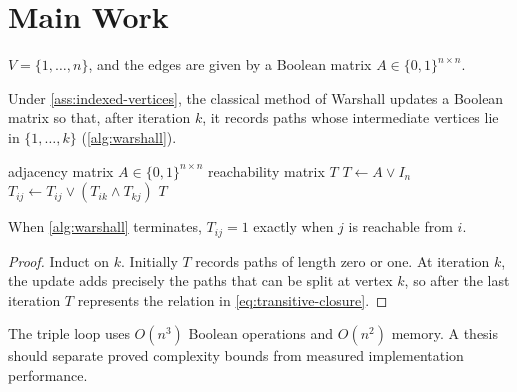 \chapter{Main Work}
\label{ch:main-work}


\begin{assumption}
\label{ass:indexed-vertices}
$V=\{1,\dots,n\}$, and the edges are given by a Boolean matrix
$A\in\{0,1\}^{n\times n}$.
\end{assumption}

Under \cref{ass:indexed-vertices}, the classical method of Warshall
\cite{warshall1962} updates a Boolean matrix so that, after iteration $k$, it
records paths whose intermediate vertices lie in $\{1,\dots,k\}$
(\cref{alg:warshall}).

\begin{algorithm}[htbp]
\caption{Reflexive transitive closure of an adjacency matrix}
\label{alg:warshall}
\begin{algorithmic}[1]
  \Require adjacency matrix $A\in\{0,1\}^{n\times n}$
  \Ensure reachability matrix $T$
  \State $T\gets A\lor I_n$
        \State $T_{ij}\gets T_{ij}\lor(T_{ik}\land T_{kj})$
      \EndFor
    \EndFor
  \EndFor
  \State \Return $T$
\end{algorithmic}
\end{algorithm}

\begin{proposition}
\label{prop:warshall-correct}
When \cref{alg:warshall} terminates, $T_{ij}=1$ exactly when $j$ is reachable
from $i$.
\end{proposition}

\begin{proof}
Induct on $k$. Initially $T$ records paths of length zero or one. At iteration
$k$, the update adds precisely the paths that can be split at vertex $k$, so
after the last iteration $T$ represents the relation in
\cref{eq:transitive-closure}.
\end{proof}

The triple loop uses $O(n^3)$ Boolean operations and $O(n^2)$ memory. A thesis
should separate proved complexity bounds from measured implementation
performance.
